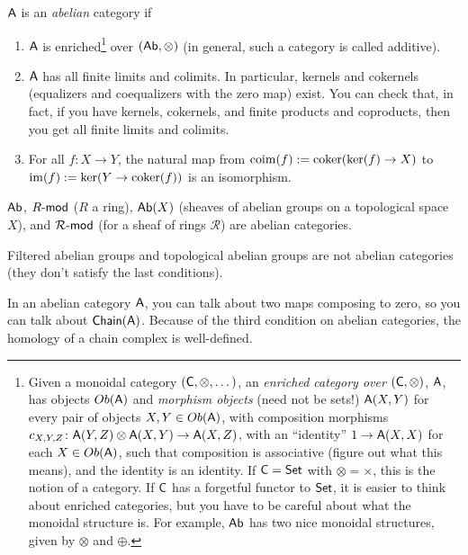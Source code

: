 
\begin{definition}
 $\A$ is an \emph{abelian} category if
 \begin{enumerate}
  \item $\A$ is enriched\footnote{Given a monoidal category $(\C,\otimes,\dots)$, an \emph{enriched category over $(\C,\otimes)$}, $\A$, has objects $Ob(\A)$ and \emph{morphism objects} (need not be sets!) $\A(X,Y)$ for every pair of objects $X,Y\in Ob(\A)$, with composition morphisms $c_{X,Y,Z}\colon \A(Y,Z)\otimes \A(X,Y)\to \A(X,Z)$, with an ``identity'' $1\to \A(X,X)$ for each $X\in Ob(\A)$, such that composition is associative (figure out what this means), and the identity is an identity. If $\C=\set$ with $\otimes=\times$, this is the notion of a category. If $\C$ has a forgetful functor to $\set$, it is easier to think about enriched categories, but you have to be careful about what the monoidal structure is. For example, $\ab$ has two nice monoidal structures, given by $\otimes$ and $\oplus$.} over $(\ab,\otimes)$ (in general, such a category is called additive).
  \item $\A$ has all finite limits and colimits. In particular, kernels and cokernels (equalizers and coequalizers with the zero map) exist. You can check that, in fact, if you have kernels, cokernels, and finite products and coproducts, then you get all finite limits and colimits.
  \item For all $f\colon X\to Y$, the natural map from $\mathrm{coim}(f):=\coker(\ker(f)\to X)$ to $\im(f):=\ker(Y\to \coker(f))$ is an isomorphism. \qedhere
 \end{enumerate}
\end{definition}
\begin{example}
 $\ab$, $R\mod$ ($R$ a ring), $\ab(X)$ (sheaves of abelian groups on a topological space $X$), and $\mathcal R\mod$ (for a sheaf of rings $\mathcal R$) are abelian categories.
\end{example}
\begin{example}
 Filtered abelian groups and topological abelian groups are not abelian categories (they don't satisfy the last conditions).
\end{example}
In an abelian category $\A$, you can talk about two maps composing to zero, so you can talk about $\chain(\A)$. Because of the third condition on abelian categories, the homology of a chain complex is well-defined.

